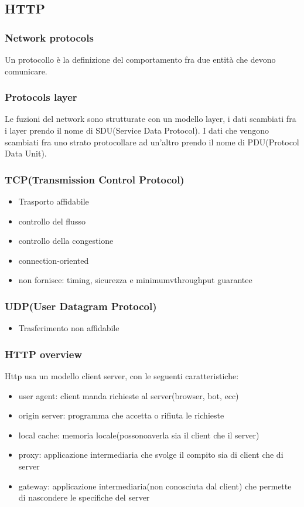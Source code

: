 \subsection{HTTP}
\subsubsection{Network protocols}
Un protocollo è la definizione del comportamento fra due entità che devono comunicare.
\subsubsection{Protocols layer}
Le fuzioni del network sono strutturate con un modello layer, i dati scambiati fra i layer prendo il nome di SDU(Service Data Protocol).
I dati che vengono scambiati fra uno strato protocollare ad un'altro prendo il nome di PDU(Protocol Data Unit).

\subsubsection{TCP(Transmission Control Protocol)}
\begin{itemize}
    \item Trasporto affidabile
    \item controllo del flusso
    \item controllo della congestione
    \item connection-oriented
    \item non fornisce: timing, sicurezza e minimumvthroughput guarantee
\end{itemize}

\subsubsection{UDP(User Datagram Protocol)}
\begin{itemize}
    \item Trasferimento non affidabile
\end{itemize}

\subsubsection{HTTP overview}
Http usa un modello client server, con le seguenti caratteristiche:
\begin{itemize}
    \item user agent: client manda richieste al server(browser, bot, ecc)
    \item origin server: programma che accetta o rifiuta le richieste
    \item local cache: memoria locale(possonoaverla sia il client che il server)
    \item proxy: applicazione intermediaria che svolge il compito sia di client che di server
    \item gateway: applicazione intermediaria(non conosciuta dal client) che permette di nascondere le specifiche del server
\end{itemize}

